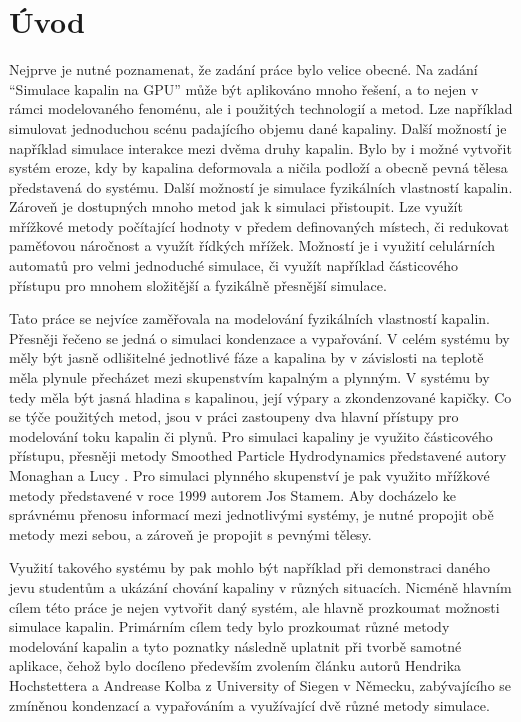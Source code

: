 \chapter{Úvod}
\label{chapter:uvod}
Nejprve je nutné poznamenat, že zadání práce bylo velice obecné. Na zadání \enquote{Simulace kapalin na GPU} může být aplikováno mnoho řešení, a to nejen v rámci modelovaného fenoménu, ale i použitých technologií a metod. Lze například simulovat jednoduchou scénu padajícího objemu dané kapaliny. Další možností je například simulace interakce mezi dvěma druhy kapalin. Bylo by i možné vytvořit systém eroze, kdy by kapalina deformovala a ničila podloží a obecně pevná tělesa představená do systému. Další možností je simulace fyzikálních vlastností kapalin. Zároveň je dostupných mnoho metod jak k simulaci přistoupit. Lze využít mřížkové metody počítající hodnoty v předem definovaných místech, či redukovat paměťovou náročnost a využít řídkých mřížek. Možností je i využití celulárních automatů pro velmi jednoduché simulace, či využít například částicového přístupu pro mnohem složitější a fyzikálně přesnější simulace.

Tato práce se nejvíce zaměřovala na modelování fyzikálních vlastností kapalin. Přesněji řečeno se jedná o simulaci kondenzace a vypařování. V celém systému by měly být jasně odlišitelné jednotlivé fáze a kapalina by v závislosti na teplotě měla plynule přecházet mezi skupenstvím kapalným a plynným. V systému by tedy měla být jasná hladina s kapalinou, její výpary a zkondenzované kapičky. Co se týče použitých metod, jsou v práci zastoupeny dva hlavní přístupy pro modelování toku kapalin či plynů. Pro simulaci kapaliny je využito částicového přístupu, přesněji metody Smoothed Particle Hydrodynamics představené autory Monaghan \cite{Monaghan77} a Lucy \cite{Lucy77}. Pro simulaci plynného skupenství je pak využito mřížkové metody představené v roce 1999 autorem Jos Stamem. \cite{Stam99} Aby docházelo ke správnému přenosu informací mezi jednotlivými systémy, je nutné propojit obě metody mezi sebou, a zároveň je propojit s pevnými tělesy.

Využití takového systému by pak mohlo být například při demonstraci daného jevu studentům a ukázání chování kapaliny v různých situacích. Nicméně hlavním cílem této práce je nejen vytvořit daný systém, ale hlavně prozkoumat možnosti simulace kapalin. Primárním cílem tedy bylo prozkoumat různé metody modelování kapalin a tyto poznatky následně uplatnit při tvorbě samotné aplikace, čehož bylo docíleno především zvolením článku \cite{Evap&Cond} autorů Hendrika Hochstettera a Andrease Kolba z University of Siegen v Německu, zabývajícího se zmíněnou kondenzací a vypařováním a využívající dvě různé metody simulace. 


